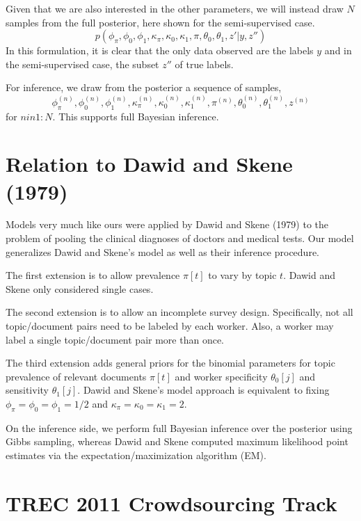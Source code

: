 \documentclass{article}
\begin{document}
Given that we are also interested in the other parameters, we will
instead draw $N$ samples from the full posterior, here shown for
the semi-supervised case.
%
\begin{equation*}
p(\phi_{\pi},\phi_0,\phi_1,\kappa_{\pi},\kappa_0,\kappa_1,\pi,\theta_0,\theta_1,z'|y,z'')
\end{equation*}
%
In this formulation, it is clear that the only data observed 
are the labels $y$ and in the semi-supervised case, the subset
$z''$ of true labels.  

For inference, we draw from the posterior a sequence of samples,
%
\begin{equation*}
\phi_{\pi}^{(n)}, \phi_0^{(n)}, \phi_1^{(n)},
\kappa_{\pi}^{(n)}, \kappa_0^{(n)}, \kappa_1^{(n)}, 
\pi^{(n)}, \theta_0^{(n)}, \theta_1^{(n)},
z^{(n)}
\end{equation*}
%
for $n in 1{:}N$.  This supports full Bayesian inference.  



\section{Relation to Dawid and Skene (1979)}

Models very much like ours were applied by Dawid and Skene
(1979) to the problem of pooling the clinical diagnoses of doctors
and medical tests.  Our model generalizes Dawid and Skene's model as
well as their inference procedure.

The first extension is to allow prevalence $\pi[t]$ to vary by topic
$t$.  Dawid and Skene only considered single cases.  

The second extension is to allow an incomplete survey design.
Specifically, not all topic/document pairs need to be labeled by each
worker.  Also, a worker may label a single topic/document pair more
than once.

The third extension adds general priors for the binomial parameters
for topic prevalence of relevant documents $\pi[t]$ and worker
specificity $\theta_0[j]$ and sensitivity $\theta_1[j]$.  Dawid and
Skene's model approach is equivalent to fixing $\phi_{\pi} = \phi_0 =
\phi_1 = 1/2$ and $\kappa_{\pi} = \kappa_0 = \kappa_1 = 2$.

On the inference side, we perform full Bayesian inference over the
posterior using Gibbs sampling, whereas Dawid and Skene computed maximum
likelihood point estimates via the expectation/maximization algorithm
(EM).


\section{TREC 2011 Crowdsourcing Track}
\end{document}
